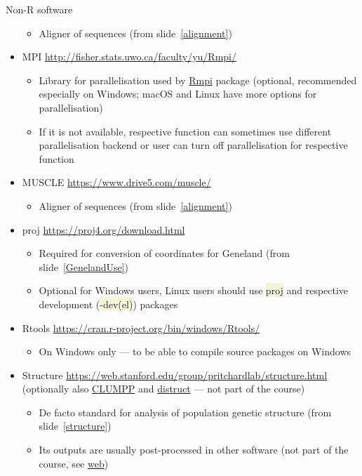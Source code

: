 \documentclass[compress, ucs, xelatex, 11pt, xcolor=svgnames, aspectratio=169,
	hyperref={
		bookmarks=true,
		unicode=true,
		colorlinks=true,
		pdftitle={Molecular data in R},
		plainpages=false,
		pdfauthor={Vojtech Zeisek},
		pdfsubject={Course about phylogeny and evolution in R},
		pdfcreator={XeLaTeX},
		pdfkeywords={R, evolution, phylogeny, molecular data},
		linkcolor=Crimson, %
		anchorcolor=Magenta, %
		citecolor=Magenta, %
		filecolor=Magenta, %
		menucolor=Magenta, %
		urlcolor=DodgerBlue, %
		pdftex},
	url={hyphens, lowtilde} %
	]{beamer}
\renewcommand{\texttt}[1]{\colorbox{Beige}{{\ttfamily #1}}}
\begin{document}
\begin{frame}[allowframebreaks]{Non-R software}
\begin{itemize}
		\begin{itemize}
			\item Aligner of sequences (from slide~\ref{alignment})
		\end{itemize}
		\item MPI \url{http://fisher.stats.uwo.ca/faculty/yu/Rmpi/} %
		\begin{itemize}
			\item Library for parallelisation used by \href{https://CRAN.R-project.org/package=Rmpi}{Rmpi} package (optional, recommended especially on Windows; macOS and Linux have more options for parallelisation)
			\item If it is not available, respective function can sometimes use different parallelisation backend or user can turn off parallelisation for respective function
		\end{itemize}
		\item MUSCLE \url{https://www.drive5.com/muscle/}
		\begin{itemize}
			\item Aligner of sequences (from slide~\ref{alignment})
		\end{itemize}
		\item proj \url{https://proj4.org/download.html}
		\begin{itemize}
			\item Required for conversion of coordinates for Geneland (from slide~\ref{GenelandUse})
			\item Optional for Windows users, Linux users should use \texttt{proj} and respective development (\texttt{-dev(el)}) packages
		\end{itemize}
		\item Rtools \url{https://cran.r-project.org/bin/windows/Rtools/}
		\begin{itemize}
			\item \alert{On Windows only} --- to be able to compile source packages on Windows
		\end{itemize}
		\item Structure \url{https://web.stanford.edu/group/pritchardlab/structure.html} (optionally also \href{https://web.stanford.edu/group/rosenberglab/clumpp.html}{CLUMPP} and \href{https://web.stanford.edu/group/rosenberglab/distruct.html}{distruct} --- not part of the course)
		\begin{itemize}
			\item De facto standard for analysis of population genetic structure (from slide~\ref{structure})
			\item Its outputs are usually post-processed in other software (not part of the course, see \href{https://trapa.cz/en/structure-r-linux}{web})
		\end{itemize}
	\end{itemize}
\end{frame}
\end{document}
